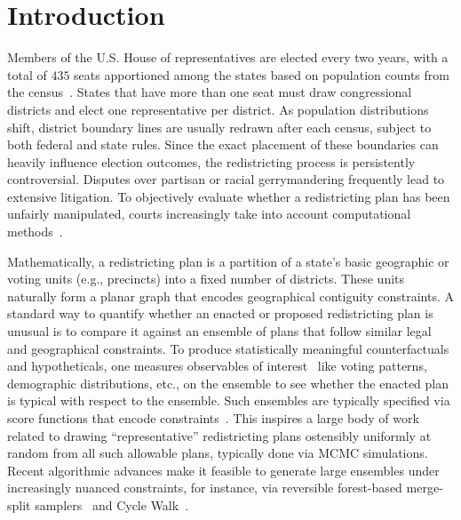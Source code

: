 \section{Introduction}
Members of the U.S. House of representatives are elected every two years, with a total of $435$ seats apportioned among the states based on population counts from the census~\cite{eckman2019apportionment}.
States that have more than one seat must draw congressional districts and elect one representative per district.
As population distributions shift, district boundary lines are usually redrawn after each census, subject to both federal and state rules.
Since the exact placement of these boundaries can heavily influence election outcomes, the redistricting process is persistently controversial.
Disputes over partisan or racial gerrymandering frequently lead to extensive litigation.
To objectively evaluate whether a redistricting plan has been unfairly manipulated, courts increasingly take into account computational methods~\cite{mattingly2021expert,mattingly2019expert}.

Mathematically, a redistricting plan is a partition of a state's basic geographic or voting units (e.g., precincts) into a fixed number of districts.
These units naturally form a planar graph that encodes geographical contiguity constraints.
A standard way to quantify whether an enacted or proposed redistricting plan is unusual is to compare it against an ensemble of plans that follow similar legal and geographical constraints.
To produce statistically meaningful counterfactuals and hypotheticals, one measures observables of interest~\cite{mattingly2014redistricting,fifield2015new} like voting patterns, demographic distributions, etc., on the ensemble to see whether the enacted plan is typical with respect to the ensemble.
Such ensembles are typically specified via score functions that encode constraints~\cite{mattingly2014redistricting}.
This inspires a large body of work related to drawing ``representative'' redistricting plans ostensibly uniformly at random from all such allowable plans, typically done via MCMC simulations.
Recent algorithmic advances make it feasible to generate large ensembles under increasingly nuanced constraints, for instance, via reversible forest-based merge-split samplers~\cite{autry2020multi,autry2023metropolized} and Cycle Walk~\cite{cyclewalk}.


